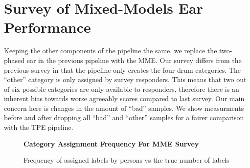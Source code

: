 \documentclass[\main/thesis.tex]{subfiles}
\begin{document}
 \section{Survey of Mixed-Models Ear Performance}
 Keeping the other components of the pipeline the same, we replace the two-phased ear in the previous pipeline with the MME. Our survey differs from the previous survey in that the pipeline only creates the four drum categories. The \enquote{other} category is only assigned by survey responders. This means that two out of six possible categories are only available to responders, therefore there is an inherent bias towards worse agreeably scores compared to last survey. Our main concern here is changes in the amount of \enquote{bad} samples. We show measurments before and after dropping all \enquote{bad} and \enquote{other} samples for a fairer comparison with the TPE pipeline.

 \begin{table}[t]
\caption{\label{kappa_table_MME}Table of Fleiss' kappa coefficient to measure the degree of agreement between persons (HvH) and persons and MME. We also measure the agreeability scores after dropping bad samples if both or either persons assigned the sample as such. We also measure agree-ability when all samples deemed \enquote{bad} or \enquote{other} by either person are removed.}
\end{table}

\begin{figure}[htpb]
    \begin{center}
    \textbf{Category Assignment Frequency For MME Survey}
    \end{center}
    \caption{Frequency of assigned labels by persons vs the true number of labels}
\label{fig:freq-survey-2p}
\end{figure} 
\end{document}
